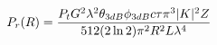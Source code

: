 \documentclass[preview]{standalone}
\begin{document}
\begin{align*}
\special{dvisvgm:raw <g id='unique000'>}P_r(R) = \frac{P_t G^2 \lambda^2 \theta_{3dB} \phi_{3dB} c\tau \pi^3 |K|^2 Z}{512 (2\ln 2) \pi^2 R^2 L \lambda^4}\special{dvisvgm:raw </g>}
\end{align*}
\end{document}
